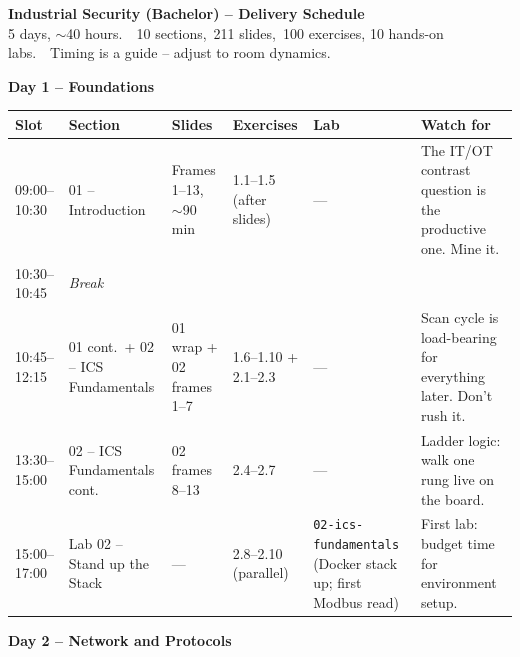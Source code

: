 \documentclass[10pt,a4paper,landscape]{article}
\newcommand{\sectionheader}[1]{%
  \noindent\colorbox{slideBlue}{\parbox{\dimexpr\textwidth-2\fboxsep}{%
    \color{white}\textbf{#1}}}\vspace{1mm}\par%
}
\begin{document}
\begin{center}
{\Large\bfseries Industrial Security (Bachelor) -- Delivery Schedule}\\[2mm]
{\footnotesize 5 days, $\sim$40 hours.\ \ 10 sections,\ 211 slides,\ 100 exercises, 10 hands-on labs.\ \ Timing is a guide -- adjust to room dynamics.}
\end{center}

\vspace{2mm}

\sectionheader{Day 1 -- Foundations}

\begin{tabular}{|p{2.2cm}|p{4.0cm}|p{4.2cm}|p{4.0cm}|p{4.8cm}|p{4.0cm}|}
\hline
\rowcolor{slidePanel}
\textbf{Slot} & \textbf{Section} & \textbf{Slides} & \textbf{Exercises} & \textbf{Lab} & \textbf{Watch for} \\
\hline
09:00--10:30 & 01 -- Introduction & Frames 1--13, $\sim$90 min & 1.1--1.5 (after slides) & --- & The IT/OT contrast question is the productive one. Mine it. \\
\hline
10:30--10:45 & \multicolumn{5}{l|}{\textit{Break}} \\
\hline
10:45--12:15 & 01 cont.\ + 02 -- ICS Fundamentals & 01 wrap + 02 frames 1--7 & 1.6--1.10 + 2.1--2.3 & --- & Scan cycle is load-bearing for everything later. Don't rush it. \\
\hline
13:30--15:00 & 02 -- ICS Fundamentals cont. & 02 frames 8--13 & 2.4--2.7 & --- & Ladder logic: walk one rung live on the board. \\
\hline
15:00--17:00 & Lab 02 -- Stand up the Stack & --- & 2.8--2.10 (parallel) & \texttt{02-ics-fundamentals} (Docker stack up; first Modbus read) & First lab: budget time for environment setup. \\
\hline
\end{tabular}

\vspace{4mm}

\sectionheader{Day 2 -- Network and Protocols}
\end{document}
